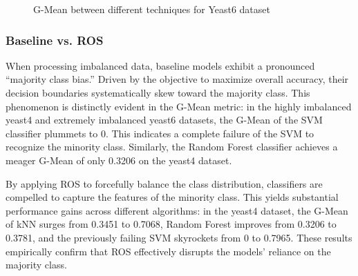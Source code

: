 \documentclass[sigconf]{acmart}
\begin{document}
\begin{figure}[h]
  \centering
  \caption{G-Mean between different techniques for Yeast6 dataset}
  \label{fig:yeast6_gmean}
\end{figure}
\clearpage

\subsubsection{Baseline vs. ROS}
When processing imbalanced data, baseline models exhibit a pronounced ``majority class bias.'' Driven by the objective to maximize overall accuracy, their decision boundaries systematically skew toward the majority class. This phenomenon is distinctly evident in the G-Mean metric: in the highly imbalanced yeast4 and extremely imbalanced yeast6 datasets, the G-Mean of the SVM classifier plummets to 0. This indicates a complete failure of the SVM to recognize the minority class. Similarly, the Random Forest classifier achieves a meager G-Mean of only 0.3206 on the yeast4 dataset. 

By applying ROS to forcefully balance the class distribution, classifiers are compelled to capture the features of the minority class. This yields substantial performance gains across different algorithms: in the yeast4 dataset, the G-Mean of kNN surges from 0.3451 to 0.7068, Random Forest improves from 0.3206 to 0.3781, and the previously failing SVM skyrockets from 0 to 0.7965. These results empirically confirm that ROS effectively disrupts the models' reliance on the majority class. 
\end{document}
